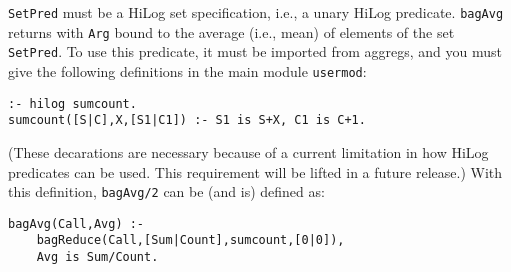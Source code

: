 \begin{description}
%
    {\tt SetPred} must be a HiLog set specification, i.e., a unary
    HiLog predicate.  {\tt bagAvg} returns with {\tt Arg} bound to the
    average (i.e., mean) of elements of the set {\tt SetPred}.  To use
    this predicate, it must be imported from aggregs, and you must give
    the following definitions in the main module {\tt usermod}:
\begin{verbatim}
:- hilog sumcount.
sumcount([S|C],X,[S1|C1]) :- S1 is S+X, C1 is C+1.
\end{verbatim}
    (These decarations are necessary because of a current limitation in
    how HiLog predicates can be used.  This requirement will be lifted in
    a future release.)  With this definition, {\tt bagAvg/2} can be (and
    is) defined as:
\begin{verbatim}
bagAvg(Call,Avg) :- 
    bagReduce(Call,[Sum|Count],sumcount,[0|0]),
    Avg is Sum/Count.
\end{verbatim}

\end{description}



